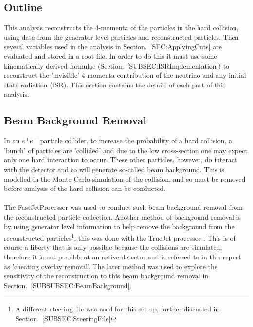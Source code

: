 \subsection{Outline}
\label{SUBSEC:Outline}
This analysis reconstructs the 4-momenta of the particles in the hard collision, using data from the generator level particles and reconstructed particles. Then several variables used in the analysis in Section.~\ref{SEC:ApplyingCuts} are evaluated and stored in a root file. In order to do this it must use some kinematically derived formulae (Section.~\ref{SUBSEC:ISRImplementation}) to reconstruct the 'invisible’ 4-momenta contribution of the neutrino and any initial state radiation (ISR). This section contains the details of each part of this analysis.

\subsection{Beam Background Removal}
\label{SUBSEC:BeamBackgroundRemoval}
In an $e^{+}e^{-}$ particle collider, to increase the probability of a hard collision, a 'bunch' \cite{bunch} of particles are 'collided’ and due to the low cross-section one may expect only one hard interaction to occur. These other particles, however, do interact with the detector and so will generate so-called beam background. This is modelled in the Monte Carlo simulation of the collision, and so must be removed before analysis of the hard collision can be conducted.
\\\\
The FastJetProcessor \cite{FastJet} was used to conduct such beam background removal from the reconstructed particle collection. Another method of background removal is by using generator level information to help remove the background from the reconstructed particles\footnote{A different steering file was used for this set up, further discussed in Section.~\ref{SUBSEC:SteeringFile}}, this was done with the TrueJet processor \cite{TrueJet}. This is of course a liberty that is only possible because the collisions are simulated, therefore it is not possible at an active detector and is referred to in this report as 'cheating overlay removal'. The later method was used to explore the sensitivity of the reconstruction to this beam background removal in Section.~\ref{SUBSUBSEC:BeamBackground}.

